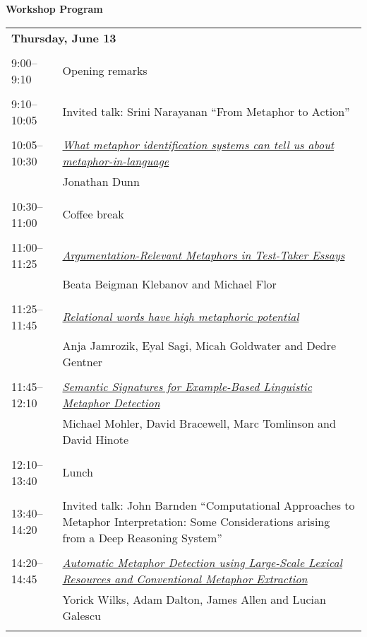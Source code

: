 \setlength{\parindent}{0in}
\setlength{\parskip}{2ex}
\renewcommand{\baselinestretch}{0.87}

\begin{center}
{\Large \bf
  Workshop Program
}
\end{center}
\vspace{3mm}
\begin{tabular}{p{20mm}p{128mm}}
\multicolumn{2}{l}{\bf Thursday, June 13} \\
\\
9:00--9:10 & Opening remarks \\
\\
9:10--10:05 & Invited talk: Srini Narayanan “From Metaphor to Action” \\
\\
10:05--10:30 & \hyperlink{page.1}{\em What metaphor identification systems can tell us about metaphor-in-language}\\
         & Jonathan Dunn \\
\\

10:30--11:00 & Coffee break \\
\\
11:00--11:25 & \hyperlink{page.11}{\em Argumentation-Relevant Metaphors in Test-Taker Essays}\\
         & Beata Beigman Klebanov and Michael Flor \\
\\

11:25--11:45 & \hyperlink{page.21}{\em Relational words have high metaphoric potential}\\
         & Anja Jamrozik, Eyal Sagi, Micah Goldwater and Dedre Gentner \\
\\

11:45--12:10 & \hyperlink{page.27}{\em Semantic Signatures for Example-Based Linguistic Metaphor Detection}\\
         & Michael Mohler, David Bracewell, Marc Tomlinson and David Hinote \\
\\

12:10--13:40 & Lunch \\
\\
13:40--14:20 & Invited talk: John Barnden “Computational Approaches to Metaphor Interpretation: Some Considerations arising from a Deep Reasoning System'' \\
\\
14:20--14:45 & \hyperlink{page.36}{\em Automatic Metaphor Detection using Large-Scale Lexical Resources and Conventional Metaphor Extraction}\\
         & Yorick Wilks, Adam Dalton, James Allen and Lucian Galescu \\
\\


\end{tabular}
